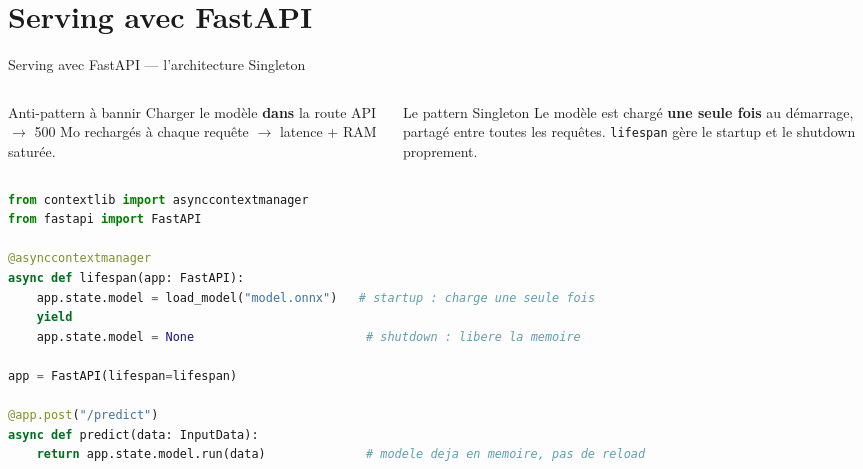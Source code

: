 \documentclass[aspectratio=169, 10pt]{beamer}
\begin{document}
\section{Serving avec FastAPI}

\begin{frame}[fragile]{Serving avec FastAPI --- l'architecture Singleton}
  \begin{columns}[T]
    \begin{column}{0.48\textwidth}
      \begin{alertblock}{Anti-pattern à bannir}
        Charger le modèle \textbf{dans} la route API $\to$
        500 Mo rechargés à chaque requête $\to$
        latence + RAM saturée.
      \end{alertblock}
    \end{column}
    \begin{column}{0.48\textwidth}
      \begin{exampleblock}{Le pattern Singleton}
        Le modèle est chargé \textbf{une seule fois} au démarrage,
        partagé entre toutes les requêtes.
        \texttt{lifespan} gère le startup et le shutdown proprement.
      \end{exampleblock}
    \end{column}
  \end{columns}
  \vspace{4pt}
\begin{lstlisting}[language=Python, basicstyle=\ttfamily\scriptsize, numbers=none]
from contextlib import asynccontextmanager
from fastapi import FastAPI

@asynccontextmanager
async def lifespan(app: FastAPI):
    app.state.model = load_model("model.onnx")   # startup : charge une seule fois
    yield
    app.state.model = None                        # shutdown : libere la memoire

app = FastAPI(lifespan=lifespan)

@app.post("/predict")
async def predict(data: InputData):
    return app.state.model.run(data)              # modele deja en memoire, pas de reload
\end{lstlisting}
\end{frame}
\end{document}
